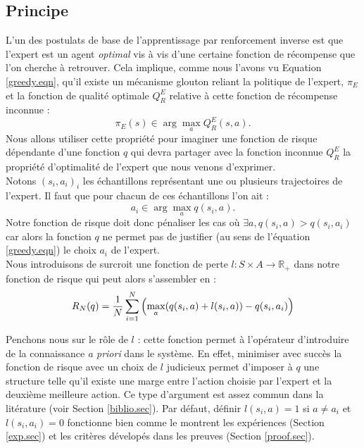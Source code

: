 \documentclass[publibook-draft]{CAp2012}
\begin{document}
\subsection{Principe}
L'un des postulats de base de l'apprentissage par renforcement inverse est que l'expert est un agent \emph{optimal} vis à vis d'une certaine fonction de récompense que l'on cherche à retrouver. Cela implique, comme nous l'avons vu Equation \eqref{greedy.eqn}, qu'il existe un mécanisme glouton reliant la politique de l'expert, $\pi_E$ et la fonction de qualité optimale $Q^E_R$ relative à cette fonction de récompense inconnue :
\begin{equation}
\pi_E(s) \in \arg\max_aQ^E_R(s,a).
\end{equation}
Nous allons utiliser cette propriété pour imaginer une fonction de risque dépendante d'une fonction $q$ qui devra partager avec la fonction inconnue $Q^E_R$ la propriété d'optimalité de l'expert que nous venons d'exprimer.\\
Notons $(s_i,a_i)_i$ les échantillons représentant une ou plusieurs trajectoires de l'expert. Il faut que pour chacun de ces échantillons l'on ait :
\begin{equation}
\label{butLAFEM.eqn}
a_i \in \arg\max_aq(s_i,a).
\end{equation}
Notre fonction de risque doit donc pénaliser les cas où $\exists a, q(s_i,a)>q(s_i,a_i)$ car alors la fonction $q$ ne permet pas de justifier (au sens de l'équation \eqref{greedy.eqn}) le choix $a_i$ de l'expert.\\
Nous introduisons de surcroit une fonction de perte $l : S \times A \rightarrow \mathbb{R}_+$ dans notre fonction de risque qui peut alors s'assembler en :
  \begin{equation}
   R_N(q) = {1\over N} \sum_{i=1}^N\left(\max_{a}(q(s_i,a) + l(s_i,a)) - q(s_i,a_i) \right)
   \end{equation}

Penchons nous sur le rôle de $l$ : cette fonction permet à l'opérateur d'introduire de la connaissance \emph{a priori} dans le système. En effet, minimiser avec succès la fonction de risque avec un choix de $l$ judicieux permet d'imposer à $q$ une structure telle qu'il existe une marge entre l'action choisie par l'expert et la deuxième meilleure action. Ce type d'argument est assez commun dans la litérature (voir Section \ref{biblio.sec}). Par défaut, définir $l(s_i,a) = 1$ si $a\neq a_i$ et $l(s_i,a_i)=0$ fonctionne bien comme le montrent les expériences (Section \ref{exp.sec}) et les critères dévelopés dans les preuves (Section \ref{proof.sec}).\\
\end{document}
